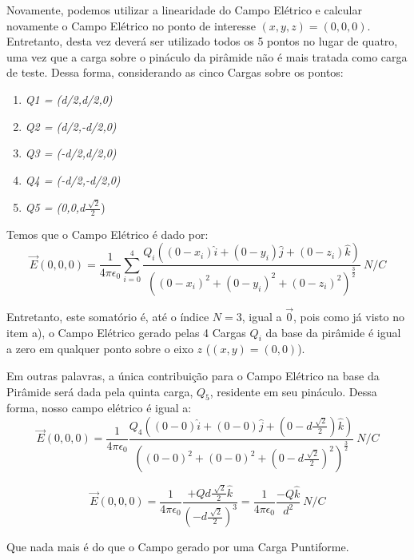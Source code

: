 \documentclass[journal,comsoc]{IEEEtran}
\begin{document}
\par Novamente, podemos utilizar a linearidade do Campo Elétrico e calcular novamente o Campo Elétrico no ponto de interesse $(x,y,z) = (0,0,0)$. Entretanto, desta vez deverá ser utilizado todos os 5 pontos no lugar de quatro, uma vez que a carga sobre o pináculo da pirâmide não é mais tratada como carga de teste. Dessa forma, considerando as cinco Cargas sobre os pontos:
\begin{enumerate}
	\item{\textit{Q1 = (d/2,d/2,0)}}
    \item{\textit{Q2 = (d/2,-d/2,0)}}
    \item{\textit{Q3 = (-d/2,d/2,0)}}
    \item{\textit{Q4 = (-d/2,-d/2,0)}}
    \item{\textit{Q5 = (0,0,d$\frac{\sqrt[]{2}}{2}$})}
\end{enumerate}
\hfill
\par Temos que o Campo Elétrico é dado por:
\begin{equation}
    	\vec{E}(0,0,0) = \frac{1}{4\pi{\epsilon}_{0}} \sum_{i=0}^{4}
        \frac
        {{Q}_{i} ((0-{x}_{i})\hat{i}+(0-{y}_{i})\hat{j}+(0-{z}_{i})\hat{k})} 
        {((0-{x}_{i})^2+(0-{y}_{i})^2+(0-{z}_{i})^2)^\frac{3}{2}}\ N/C
\end{equation}

\par Entretanto, este somatório é, até o índice $N=3$, igual a $\vec{0}$, pois como já visto no item a), o Campo Elétrico gerado pelas 4 Cargas ${Q}_{i}$ da base da pirâmide é igual a zero em qualquer ponto sobre o eixo $z$ ($(x,y) = (0,0)$).
\par Em outras palavras, a única contribuição para o Campo Elétrico na base da Pirâmide será dada pela quinta carga, $Q_{5}$, residente em seu pináculo. Dessa forma, nosso campo elétrico é igual a:
\begin{equation}
    	\vec{E}(0,0,0) = \frac{1}{4\pi{\epsilon}_{0}} \frac
        {{Q}_{4} ((0-0)\hat{i}+(0-0)\hat{j}+(0-d\frac{\sqrt[]{2}}{2})\hat{k})} 
        {((0-0)^2+(0-0)^2+(0-d\frac{\sqrt[]{2}}{2})^2)^\frac{3}{2}}\ N/C
\end{equation}

\begin{equation}
    	\vec{E}(0,0,0) = \frac{1}{4\pi{\epsilon}_{0}} \frac
        {+Qd\frac{\sqrt[]{2}}{2}\hat{k}} 
        {(-d\frac{\sqrt[]{2}}{2})^3}
        =
        \frac{1}{4\pi{\epsilon}_{0}} 			\frac
        {-Q\hat{k}} 
        {d^2}\ N/C
\end{equation}
\par Que nada mais é do que o Campo gerado por uma Carga Puntiforme.
\end{document}
